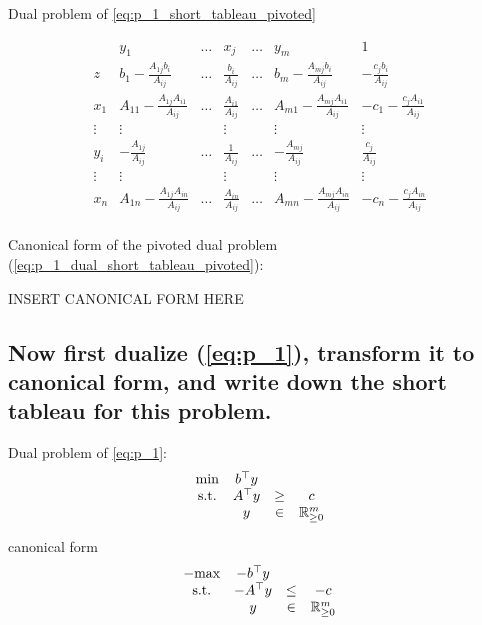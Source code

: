 \documentclass[12pt, a4]{article}
\begin{document}
{Dual problem of \ref{eq:p_1_short_tableau_pivoted}

\begin{equation}
	\begin{array}{c|ccccc||c}
		& y_1 & \ldots & x_j & \ldots & y_m & 1 \\
		\hline
		z & b_1-\frac{A_{1j}b_{i}}{A_{ij}} & \ldots & \frac{b_i}{A_{ij}} & \ldots & b_m - \frac{A_{mj}b_{i}}{A_{ij}} & -\frac{c_jb_i}{A_{ij}} \\
		\hline
		x_1 & A_{11}-\frac{A_{1j}A_{i1}}{A_{ij}} & \ldots & \frac{A_{i1}}{A_{ij}} & \ldots & A_{m1}-\frac{A_{mj}A_{i1}}{A_{ij}} & -c_1-\frac{c_jA_{i1}}{A_{ij}} \\
		\vdots & \vdots && \vdots & & \vdots & \vdots \\
		y_i & -\frac{A_{1j}}{A_{ij}} & \ldots & \frac{1}{A_{ij}} & \ldots & -\frac{A_{mj}}{A_{ij}} & \frac{c_j}{A_{ij}} \\
		\vdots & \vdots && \vdots & & \vdots & \vdots \\
		x_n & A_{1n}-\frac{A_{1j}A_{in}}{A_{ij}}  & \ldots & \frac{A_{in}}{A_{ij}} & \ldots & A_{mn}-\frac{A_{mj}A_{in}}{A_{ij}} & -c_n-\frac{c_jA_{in}}{A_{ij}} \\
	\end{array}
	\label{eq:p_1_dual_short_tableau_pivoted}
\end{equation}

Canonical form of the pivoted dual problem (\ref{eq:p_1_dual_short_tableau_pivoted}):

{\color{red} INSERT CANONICAL FORM HERE}

\subsection{Now first dualize (\ref{eq:p_1}), transform it to canonical form, and write down the short tableau for this problem.}{\label{sec:4c}}

Dual problem of \ref{eq:p_1}:
\begin{equation}{\label{eq:p_1_dual}}
	\begin{matrix}
		\text{min}& b^\top y &  & \\ 
		\text{s.t.} & A^\top y &\geq  &c\\ 
		&  y&\in  & \mathbb{R}^m_{\geq0} 
	\end{matrix}
\end{equation}

canonical form
\begin{equation}{\label{eq:p_1_dual_canonical}}
	\begin{matrix}
		-\text{max}& -b^\top y &  & \\ 
		\text{s.t.} & -A^\top y &\leq  &-c\\ 
		&  y&\in  & \mathbb{R}^m_{\geq0} 
	\end{matrix}
\end{equation}

}
\end{document}
